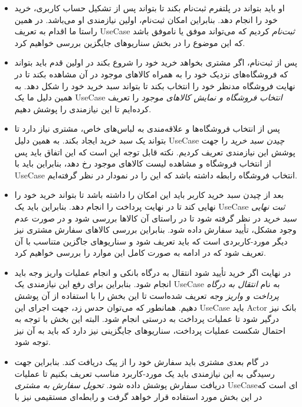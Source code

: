 \documentclass[]{article}
\begin{document}
\begin{itemize}
\item
  او باید بتواند در پلتفرم ثبت‌نام بکند تا بتواند پس از تشکیل حساب
  کاربری، خرید خود را انجام دهد. بنابراین امکان ثبت‌نام، اولین نیازمندی
  او می‌باشد. در همین راستا ما اقدام به تعریف UseCase \emph{ثبت‌نام}
  کردیم که می‌تواند موفق یا ناموفق باشد که این موضوع را در بخش
  سناریو‌های جایگزین بررسی خواهیم کرد.
\item
  پس از ثبت‌نام، اگر مشتری بخواهد خرید خود را شروع بکند در اولین قدم
  باید بتواند که فروشگاه‌های نزدیک خود را به همراه کالاهای موجود در آن
  مشاهده بکند تا در نهایت فروشگاه مدنظر خود را انتخاب بکند تا بتواند سبد
  خرید خود را شکل دهد. به همین دلیل ما یک UseCase \emph{انتخاب فروشگاه و
  نمایش کالاهای موجود} را تعریف کرده‌ایم تا این نیازمندی را پوشش دهیم.
\item
  پس از انتخاب فروشگاه‌ها و علاقه‌مندی به لباس‌های خاص، مشتری نیاز دارد
  تا بتواند یک سبد خرید ایجاد بکند. به همین دلیل UseCase \emph{چیدن سبد
  خرید} را جهت پوشش این نیازمندی تعریف کردیم. نکته قابل توجه این است که
  این اتفاق باید پس از انتخاب فروشگاه و مشاهده لیست کالاهای موجود رخ
  دهد، بنابراین باید با UseCase انتخاب فروشگاه رابطه داشته باشد که این
  را در نمودار در نظر گرفته‌ایم.
\item
  ‌بعد از چیدن سبد خرید کاربر باید این امکان را داشته باشد تا بتواند
  خرید خود را نهایی کند تا در نهایت پرداخت را انجام دهد. بنابراین باید
  یک UseCase \emph{ثبت نهایی سبد خرید} در نظر گرفته شود تا در راستای آن
  کالاها بررسی شود و در صورت عدم وجود مشکل، تأیید سفارش داده شود.
  بنابراین بررسی کالاهای سفارش مشتری نیز دیگر مورد-کاربردی است که باید
  تعریف شود و سناریوهای جاگزین متناسب با آن تعریف شود که در ادامه به
  صورت کامل این موارد را بررسی خواهیم کرد.
\item
  در نهایت اگر خرید تأیید شود انتقال به درگاه بانکی و انجام عملیات واریز
  وجه باید انجام شود. بنابراین برای رفع این نیازمندی یک UseCase به نام
  \emph{انتقال به درگاه پرداخت و واریز وجه} تعریف شده‌است تا این بخش را
  با استفاده از آن پوشش دهیم. همانطور که می‌توان حدس زد، جهت اجرای این
  UseCase باید Actor بانک نیز درگیر شود تا عملیات پرداخت به درستی انجام
  شود. البته این بخش با توجه به احتمال شکست عملیات پرداخت، سناریو‌های
  جایگزینی نیز دارد که باید به آن نیز توجه شود.
\item
  در گام بعدی مشتری باید سفارش خود را از پیک دریافت کند. بنابراین جهت
  رسیدگی به این نیازمندی باید یک مورد-کاربرد مناسب تعریف بکنیم تا عملیات
  دریافت سفارش پوشش داده شود. \emph{تحویل سفارش به مشتری} UseCaseای است
  که در این بخش مورد استفاده قرار خواهد گرفت و رابطه‌ای مستقیمی نیز با

\end{itemize}
\end{document}
